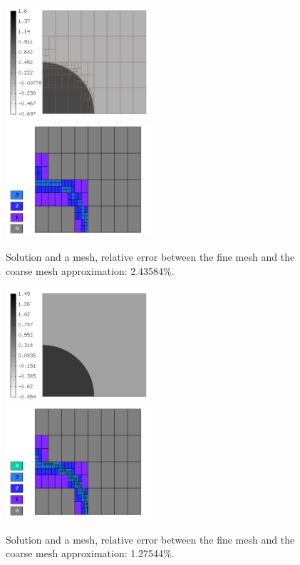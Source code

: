 \begin{figure}[H]
\begin{center}
\includegraphics[width=0.48\textwidth]{minor_examples/Sln5.png}\ \ \ 
\includegraphics[width=0.48\textwidth]{minor_examples/Space5.png}
\end{center}
\vspace{-4mm}
\caption{Solution and a mesh, relative error between the fine mesh and the coarse mesh approximation: 2.43584\%.}
\end{figure}

\begin{figure}[H]
\begin{center}
\includegraphics[width=0.48\textwidth]{minor_examples/Sln7.png}\ \ \ 
\includegraphics[width=0.48\textwidth]{minor_examples/Space7.png}
\end{center}
\vspace{-4mm}
\caption{Solution and a mesh, relative error between the fine mesh and the coarse mesh approximation: 1.27544\%.}
\end{figure}

